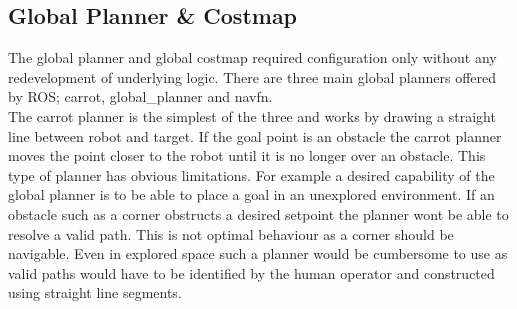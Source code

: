 \documentclass[capstone_report.tex]{subfiles}
\begin{document}
\subsection{Global Planner \& Costmap}

The global planner and global costmap required configuration only without any redevelopment of underlying logic. There are three main global planners offered by ROS; carrot, global\_planner and navfn.\\

The carrot planner is the simplest of the three and works by drawing a straight line between robot and target.  If the goal point is an obstacle the carrot planner moves the point closer to the robot until it is no longer over an obstacle.  This type of planner has obvious limitations.  For example a desired capability of the global planner is to be able to place a goal in an unexplored environment.  If an obstacle such as a corner obstructs a desired setpoint the planner wont be able to resolve a valid path.  This is not optimal behaviour as a corner should be navigable.  Even in explored space such a planner would be cumbersome to use as valid paths would have to be identified by the human operator and constructed using straight line segments.
\end{document}
